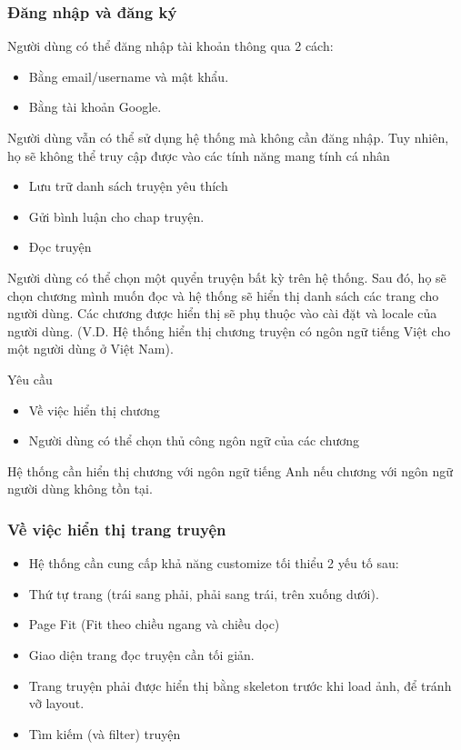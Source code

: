 \documentclass[./../main.tex]{subfiles}
\begin{document}
\subsubsection{Đăng nhập và đăng ký}
Người dùng có thể đăng nhập tài khoản thông qua 2 cách:
\begin{itemize}
\item Bằng email/username và mật khẩu.
\item Bằng tài khoản Google.
\end{itemize}
Người dùng vẫn có thể sử dụng hệ thống mà không cần đăng nhập.
Tuy nhiên, họ sẽ không thể truy cập được vào các tính năng mang tính cá nhân
\begin{itemize}
\item Lưu trữ danh sách truyện yêu thích
\item Gửi bình luận cho chap truyện.
\item Đọc truyện
\end{itemize}
Người dùng có thể chọn một quyển truyện bất kỳ trên hệ thống.
Sau đó, họ sẽ chọn chương mình muốn đọc và hệ thống sẽ hiển thị danh sách các trang cho người dùng.
Các chương được hiển thị sẽ phụ thuộc vào cài đặt và locale của người dùng. (V.D. Hệ thống hiển thị chương truyện có ngôn ngữ tiếng Việt cho một người dùng ở Việt Nam). 


Yêu cầu
\begin{itemize}
\item Về việc hiển thị chương
\item Người dùng có thể chọn thủ công ngôn ngữ của các chương
\end{itemize}
Hệ thống cần hiển thị chương với ngôn ngữ tiếng Anh nếu chương với ngôn ngữ người dùng không tồn tại.
\subsubsection{Về việc hiển thị trang truyện}
\begin{itemize}
\item Hệ thống cần cung cấp khả năng customize tối thiểu 2 yếu tố sau:
\item Thứ tự trang (trái sang phải, phải sang trái, trên xuống dưới).
\item Page Fit (Fit theo chiều ngang và chiều dọc)
\item Giao diện trang đọc truyện cần tối giản.
\item Trang truyện phải được hiển thị bằng skeleton trước khi load ảnh, để tránh vỡ layout.
\item Tìm kiếm (và filter) truyện
\end{itemize}
\end{document}
